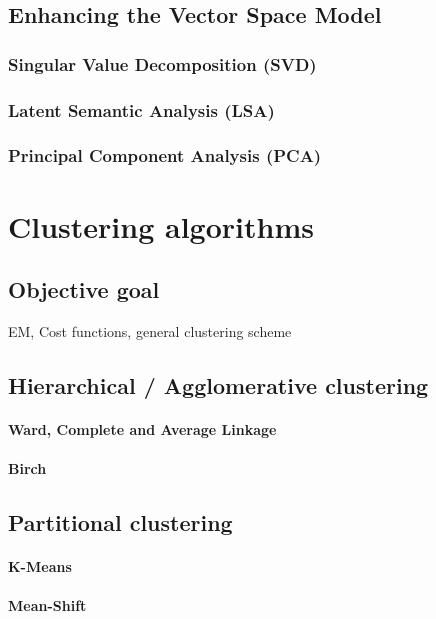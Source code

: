   \subsection{Enhancing the Vector Space Model}
    \subsubsection{Singular Value Decomposition (SVD)}
    \subsubsection{Latent Semantic Analysis (LSA)}
    \subsubsection{Principal Component Analysis (PCA)}

\section{Clustering algorithms}

  \subsection{Objective goal}
    EM, Cost functions, general clustering scheme

  \subsection{Hierarchical / Agglomerative clustering}
    \paragraph{Ward, Complete and Average Linkage}
    \paragraph{Birch}

  \subsection{Partitional clustering}
    \paragraph{K-Means}
    \paragraph{Mean-Shift}

